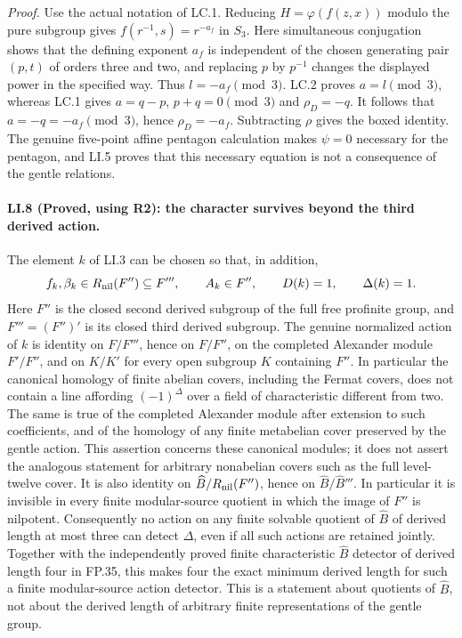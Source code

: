 \emph{Proof.}
Use the actual notation of LC.1. Reducing
$H=\varphi(f(z,x))$ modulo the pure subgroup gives
$f(r^{-1},s)=r^{-a_f}$ in $S_3$. Here simultaneous conjugation
shows that the defining exponent $a_f$ is independent of the
chosen generating pair $(p,t)$ of orders three and two, and
replacing $p$ by $p^{-1}$ changes the displayed power in the
specified way. Thus $l=-a_f\pmod3$.
LC.2 proves $a=l\pmod3$, whereas LC.1 gives
$a=q-p$, $p+q=0\pmod3$ and $\rho_D=-q$.
It follows that $a=-q=-a_f\pmod3$, hence
$\rho_D=-a_f$. Subtracting $\rho$ gives the boxed identity.
The genuine five-point affine pentagon calculation makes
$\psi=0$ necessary for the pentagon, and LI.5 proves that this
necessary equation is not a consequence of the gentle relations.

\paragraph{LI.8 (Proved, using R2): the character survives beyond the third derived action.}
The element $k$ of LI.3 can be chosen so that, in addition,
\[
       f_k,\beta_k\in R_{\rm nil}(F'')\subseteq F''',
       \qquad A_k\in F'',
       \qquad D(k)=1,\qquad\Delta(k)=1.
\]
Here $F''$ is the closed second derived subgroup of the full
free profinite group, and $F'''=(F'')'$ is its closed third
derived subgroup. The genuine normalized action of $k$ is
identity on $F/F'''$, hence on $F/F''$, on the completed Alexander module
$F'/F''$, and on $K/K'$ for every open subgroup $K$ containing
$F''$. In particular the canonical homology of finite abelian
covers, including the Fermat covers, does not contain a line
affording $(-1)^\Delta$ over a field of characteristic different
from two. The same is true of the completed Alexander module
after extension to such coefficients, and of the homology of
any finite metabelian cover preserved by the gentle action.
This assertion concerns these canonical modules; it does not
assert the analogous statement for arbitrary nonabelian covers
such as the full level-twelve cover.
It is also identity on $\widehat B/R_{\rm nil}(F'')$, hence
on $\widehat B/\widehat B'''$. In particular it is invisible
in every finite modular-source quotient in which the image
of $F''$ is nilpotent.
Consequently no action on any finite solvable quotient of
$\widehat B$ of derived length at most three can detect
$\Delta$, even if all such actions are retained jointly.
Together with the independently proved finite characteristic
$\widehat B$ detector of derived length four in FP.35, this
makes four the exact minimum derived length for such a
finite modular-source action detector. This is a statement
about quotients of $\widehat B$, not about the derived length
of arbitrary finite representations of the gentle group.

